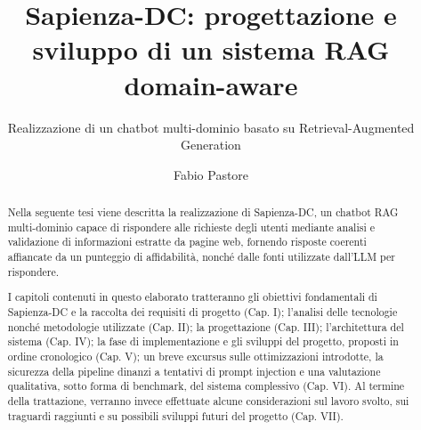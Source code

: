 \documentclass[binding=0.6cm, noexaminfo]{sapthesis}
\title{Sapienza-DC: progettazione e sviluppo di un sistema RAG domain-aware}
\subtitle{Realizzazione di un chatbot multi-dominio basato su Retrieval-Augmented Generation}
\author{Fabio Pastore}
\begin{document}
\frontmatter
\maketitle

\dedication{Sapere aude.}

\begin{abstract}
Nella seguente tesi viene descritta la realizzazione di Sapienza-DC,
un chatbot RAG multi-dominio capace di rispondere alle richieste degli
utenti mediante analisi e validazione di informazioni estratte da pagine web, fornendo risposte coerenti affiancate da un punteggio di affidabilità, nonché dalle fonti utilizzate dall'LLM per rispondere.

I capitoli contenuti in questo elaborato tratteranno gli obiettivi fondamentali di Sapienza-DC e la raccolta dei requisiti di progetto (Cap. I); l'analisi delle tecnologie nonché metodologie utilizzate (Cap. II); la progettazione (Cap. III); l'architettura del sistema (Cap. IV); la fase di implementazione e gli sviluppi del progetto, proposti in ordine cronologico (Cap. V); un breve excursus sulle ottimizzazioni introdotte, la sicurezza della pipeline dinanzi a tentativi di prompt injection e una valutazione qualitativa, sotto forma di benchmark, del sistema complessivo (Cap. VI). Al termine della trattazione, verranno invece effettuate alcune considerazioni sul lavoro svolto, sui traguardi raggiunti e su possibili sviluppi futuri del progetto (Cap. VII).
\end{abstract}

\tableofcontents

\mainmatter








\backmatter


\cleardoublepage
{} 
{}
\printbibliography
\end{document}
